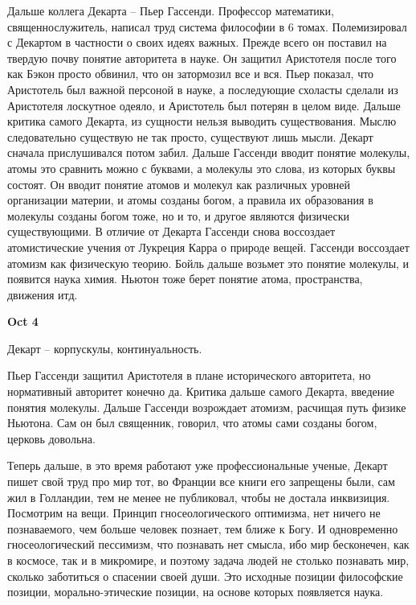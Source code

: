 \documentclass[a4paper, 12pt]{article}
\begin{document}
Дальше коллега Декарта -- Пьер Гассенди. Профессор математики, 
священнослужитель, написал труд система философии в 6 томах. 
Полемизировал с Декартом в частности о своих идеях важных. Прежде всего 
он поставил на твердую почву понятие авторитета в науке. Он защитил 
Аристотеля после того как Бэкон просто обвинил, что он затормозил все 
и вся. Пьер показал, что Аристотель был важной персоной в науке, 
а последующие схоласты сделали из Аристотеля лоскутное одеяло, 
и Аристотель был потерян в целом виде. Дальше критика самого Декарта, из 
сущности нельзя выводить существования. Мыслю следовательно существую не 
так просто, существуют лишь мысли. Декарт сначала прислушивался потом 
забил. Дальше Гассенди вводит понятие молекулы, атомы это сравнить можно 
с буквами, а молекулы это слова, из которых буквы состоят. Он вводит 
понятие атомов и молекул как различных уровней организации материи, 
и атомы созданы богом, а правила их образования в молекулы созданы богом 
тоже, но и то, и другое являются физически существующими. В отличие от 
Декарта Гассенди снова воссоздает атомистические учения от Лукреция 
Карра о природе вещей. Гассенди воссоздает атомизм как физическую 
теорию. Бойль дальше возьмет это понятие молекулы, и появится наука 
химия. Ньютон тоже берет понятие атома, пространства, движения итд.

\hfill \textbf{Oct 4}

Декарт -- корпускулы, континуальность.

Пьер Гассенди защитил Аристотеля в плане исторического авторитета, но 
нормативный авторитет конечно да. Критика дальше самого Декарта, 
введение понятия молекулы. Дальше Гассенди возрождает атомизм, расчищая 
путь физике Ньютона. Сам он был священник, говорил, что атомы сами 
созданы богом, церковь довольна.

Теперь дальше, в это время работают уже профессиональные ученые, Декарт 
пишет свой труд про мир тот, во Франции все книги его запрещены были, 
сам жил в Голландии, тем не менее не публиковал, чтобы не достала 
инквизиция. Посмотрим на вещи. Принцип гносеологического оптимизма, 
нет ничего не познаваемого, чем больше человек познает, тем ближе 
к Богу. И одновременно гносеологический пессимизм, что познавать нет 
смысла, ибо мир бесконечен, как в космосе, так и в микромире, и поэтому 
задача людей не столько познавать мир, сколько заботиться о спасении 
своей души. Это исходные позиции философские позиции, морально-этические 
позиции, на основе которых появляется наука.

\end{document}
